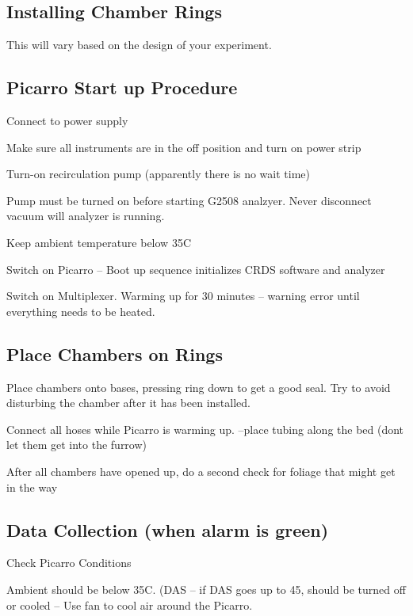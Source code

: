 \documentclass[12pt]{../SOP3}\usepackage[]{graphicx}\usepackage[]{color}
\begin{document}
\subsection*{Installing Chamber Rings}

\NP This will vary based on the design of your experiment. 

\subsection*{Picarro Start up Procedure}

\NP Connect to power supply

\NP Make sure all instruments are in the off position and turn on power strip

\NP Turn-on recirculation pump (apparently there is no wait time)

\NP Pump must be turned on before starting G2508 analzyer. Never disconnect vacuum will analyzer is running.

\NP Keep ambient temperature below 35\degree C

\NP Switch on Picarro  -- Boot up sequence initializes CRDS software and analyzer

\NP Switch on Multiplexer. Warming up for 30 minutes -- warning error until everything needs to be heated.

\subsection*{Place Chambers on Rings}

\NP Place chambers onto bases, pressing ring down to get a good seal. Try to avoid disturbing the chamber after it has been installed. 

\NP Connect all hoses while Picarro is warming up. --place tubing along the bed (dont let them get into the furrow)

\NP After all chambers have opened up, do a second check for foliage that might get in the way

\subsection*{Data Collection (when alarm is green)}

\NP Check Picarro Conditions

\NP Ambient should be below 35\degree C. (DAS -- if DAS goes up to 45\degree, should be turned off or cooled -- Use fan to cool air around the Picarro.
                               
\end{document}

